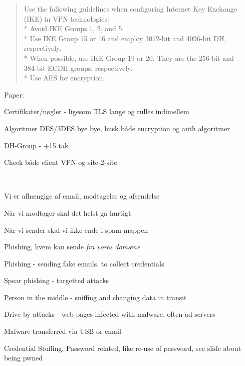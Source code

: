 \documentclass[Screen16to9,17pt]{foils}
\begin{document}
\begin{quote}
  Use the following guidelines when configuring Internet Key Exchange (IKE) in VPN technologies:\\
* Avoid IKE Groups 1, 2, and 5.\\
* Use IKE Group 15 or 16 and employ 3072-bit and 4096-bit DH, respectively.\\
* When possible, use IKE Group 19 or 20. They are the 256-bit and \\
384-bit ECDH groups, respectively.\\
* Use AES for encryption.
\end{quote}
Paper:\\
{\small {}}

\begin{list2}
\item Certifikater/nøgler - ligesom TLS lange og rulles indimellem
\item Algoritmer DES/3DES bye bye, husk både encryption og auth algoritmer
\item DH-Group - +15 tak
\item Check både client VPN og site-2-site
\end{list2}


{~}

\begin{list2}
\item Vi er afhængige af email, modtagelse og afsendelse
\item Når vi modtager skal det helst gå hurtigt
\item Når vi sender skal vi ikke ende i spam mappen
\item Phishing, hvem kan sende \emph{fra vores domæne}
\end{list2}



\begin{list2}
\item Phishing - sending fake emails, to collect credentials
\item Spear phishing - targetted attacks
\item Person in the middle - sniffing and changing data in transit
\item Drive-by attacks - web pages infected with malware, often ad servers
\item Malware transferred via USB or email
\item Credential Stuffing, Password related, like re-use of password, see slide about being pwned
\end{list2}
\end{document}

